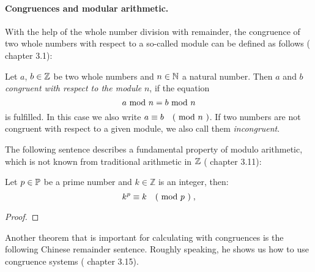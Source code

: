 \paragraph{Congruences and modular arithmetic.}


With the help of the whole number division with remainder, the congruence of two whole numbers with respect to a so-called module can be defined as follows
(\cite{JB} chapter 3.1):
\begin{definition} [congruence] Let $ a $, $ b \in \mathbb{Z} $ be two whole numbers and $ n \in \mathbb{N} $ a natural number.
Then $ a $ and $ b $ \textit{congruent with respect to the module} $ n $, if the equation
\begin{equation}
a \text{ mod } n = b \text{ mod } n
\end{equation}
is fulfilled. In this case we also write
$ a \equiv b \quad \text{( mod } n \text{ )} $. If two numbers are not congruent with respect to a given module, we also call them \textit{incongruent}.
\end{definition}
The following sentence describes a fundamental property of modulo arithmetic, which is not known from traditional arithmetic in $ \mathbb{Z} $ (\cite{JB} chapter 3.11):
\begin{theorem}  Let $ p \in \mathbb{P} $ be a prime number
and $ k \in \mathbb{Z} $ is an integer, then:
\begin{equation}
k ^ p \equiv k \quad \text{( mod } p \text{ )} \;,
\end{equation}
\end{theorem}
\begin{proof} 
\end{proof}


Another theorem that is important for calculating with congruences is the following Chinese remainder sentence. Roughly speaking, he shows us how to use congruence systems (\cite{JB} chapter 3.15).

